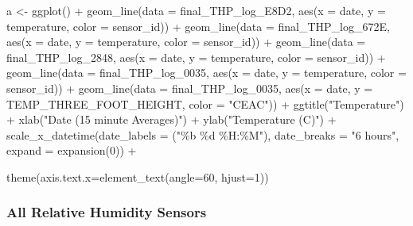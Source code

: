 \documentclass[
  letterpaper,
  DIV=11,
  numbers=noendperiod]{scrartcl}
\newenvironment{Shaded}{\begin{snugshade}}{\end{snugshade}}
\newcommand{\AttributeTok}[1]{\textcolor[rgb]{0.40,0.45,0.13}{#1}}
\newcommand{\DecValTok}[1]{\textcolor[rgb]{0.68,0.00,0.00}{#1}}
\newcommand{\FunctionTok}[1]{\textcolor[rgb]{0.28,0.35,0.67}{#1}}
\newcommand{\NormalTok}[1]{\textcolor[rgb]{0.00,0.23,0.31}{#1}}
\newcommand{\OtherTok}[1]{\textcolor[rgb]{0.00,0.23,0.31}{#1}}
\newcommand{\SpecialCharTok}[1]{\textcolor[rgb]{0.37,0.37,0.37}{#1}}
\newcommand{\StringTok}[1]{\textcolor[rgb]{0.13,0.47,0.30}{#1}}
\begin{document}
\begin{Shaded}
\begin{Highlighting}[]
\NormalTok{a }\OtherTok{\textless{}{-}} \FunctionTok{ggplot}\NormalTok{() }\SpecialCharTok{+}
    \FunctionTok{geom\_line}\NormalTok{(}\AttributeTok{data =}\NormalTok{ final\_THP\_log\_E8D2, }\FunctionTok{aes}\NormalTok{(}\AttributeTok{x =}\NormalTok{ date, }\AttributeTok{y =}\NormalTok{ temperature, }\AttributeTok{color =}\NormalTok{ sensor\_id)) }\SpecialCharTok{+}
    \FunctionTok{geom\_line}\NormalTok{(}\AttributeTok{data =}\NormalTok{ final\_THP\_log\_672E, }\FunctionTok{aes}\NormalTok{(}\AttributeTok{x =}\NormalTok{ date, }\AttributeTok{y =}\NormalTok{ temperature, }\AttributeTok{color =}\NormalTok{ sensor\_id)) }\SpecialCharTok{+}
    \FunctionTok{geom\_line}\NormalTok{(}\AttributeTok{data =}\NormalTok{ final\_THP\_log\_2848, }\FunctionTok{aes}\NormalTok{(}\AttributeTok{x =}\NormalTok{ date, }\AttributeTok{y =}\NormalTok{ temperature, }\AttributeTok{color =}\NormalTok{ sensor\_id)) }\SpecialCharTok{+}
    \FunctionTok{geom\_line}\NormalTok{(}\AttributeTok{data =}\NormalTok{ final\_THP\_log\_0035, }\FunctionTok{aes}\NormalTok{(}\AttributeTok{x =}\NormalTok{ date, }\AttributeTok{y =}\NormalTok{ temperature, }\AttributeTok{color =}\NormalTok{ sensor\_id)) }\SpecialCharTok{+}
    \FunctionTok{geom\_line}\NormalTok{(}\AttributeTok{data =}\NormalTok{ final\_THP\_log\_0035, }\FunctionTok{aes}\NormalTok{(}\AttributeTok{x =}\NormalTok{ date, }\AttributeTok{y =}\NormalTok{ TEMP\_THREE\_FOOT\_HEIGHT, }\AttributeTok{color =} \StringTok{"CEAC"}\NormalTok{)) }\SpecialCharTok{+}
    \FunctionTok{ggtitle}\NormalTok{(}\StringTok{"Temperature"}\NormalTok{) }\SpecialCharTok{+}
    \FunctionTok{xlab}\NormalTok{(}\StringTok{"Date (15 minute Averages)"}\NormalTok{) }\SpecialCharTok{+}
    \FunctionTok{ylab}\NormalTok{(}\StringTok{"Temperature (C)"}\NormalTok{) }\SpecialCharTok{+}
    \FunctionTok{scale\_x\_datetime}\NormalTok{(}\AttributeTok{date\_labels =}\NormalTok{ (}\StringTok{"\%b \%d \%H:\%M"}\NormalTok{),}
      \AttributeTok{date\_breaks =} \StringTok{"6 hours"}\NormalTok{,  }\AttributeTok{expand =} \FunctionTok{expansion}\NormalTok{(}\DecValTok{0}\NormalTok{)) }\SpecialCharTok{+}
    
    \FunctionTok{theme}\NormalTok{(}\AttributeTok{axis.text.x=}\FunctionTok{element\_text}\NormalTok{(}\AttributeTok{angle=}\DecValTok{60}\NormalTok{, }\AttributeTok{hjust=}\DecValTok{1}\NormalTok{))}
\end{Highlighting}
\end{Shaded}

\hypertarget{all-relative-humidity-sensors}{%
\subsubsection{All Relative Humidity
Sensors}\label{all-relative-humidity-sensors}}
\end{document}
